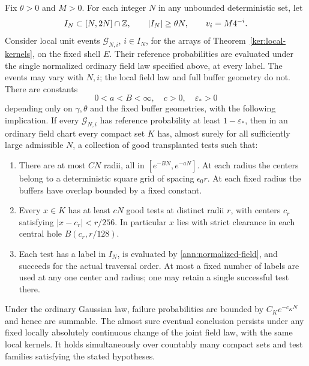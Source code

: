 \begin{theorem}\label{ann:aligned-annuli}
Fix \(\theta>0\) and \(M>0\).  For each integer \(N\) in any
unbounded deterministic set, let
\[
 I_N\subset[N,2N]\cap\mathbb Z,\qquad |I_N|\ge\theta N,\qquad
 v_i=M4^{-i}.
\]
Consider local unit events \(\mathcal G_{N,i}\), \(i\in I_N\),
for the arrays of Theorem~\ref{ker:local-kernels}, on the fixed
shell \(E\). Their reference probabilities are evaluated under the
single normalized ordinary field law specified above, at every label.
The events may vary with \(N,i\); the local field law and full
buffer geometry do not.  There are constants
\[
 0<a<B<\infty,\quad c>0,\quad \varepsilon_*>0
\]
depending only on \(\gamma,\theta\) and the fixed buffer geometries,
with the following implication.  If every \(\mathcal G_{N,i}\)
has reference probability at least \(1-\varepsilon_*\), then in
an ordinary field chart every compact set \(K\) has, almost surely
for all sufficiently large admissible \(N\), a collection of good
transplanted tests such that:
\begin{enumerate}
\item There are at most \(CN\) radii, all in
      \([e^{-BN},e^{-aN}]\).  At each radius the centers belong
      to a deterministic square grid of spacing
      \(\epsilon_0r\). At each fixed radius the buffers have overlap
      bounded by a fixed constant.
\item Every \(x\in K\) has at least \(cN\) good tests at
      distinct radii \(r\), with centers \(c_r\) satisfying
      \(|x-c_r|<r/256\).  In particular \(x\) lies with strict
      clearance in each central hole \(B(c_r,r/128)\).
\item Each test has a label in \(I_N\), is evaluated by
      \eqref{ann:normalized-field}, and succeeds for the actual
      traversal order.  At most a fixed number of labels are
      used at any one center and radius; one may retain a single
      successful test there.
\end{enumerate}
Under the ordinary Gaussian law, failure probabilities are bounded
by \(C_Ke^{-c_KN}\) and hence are summable.  The almost sure
eventual conclusion persists under any fixed locally absolutely
continuous change of the joint field law, with the same local
kernels.  It holds simultaneously over countably many compact
sets and test families satisfying the stated hypotheses.
\end{theorem}

